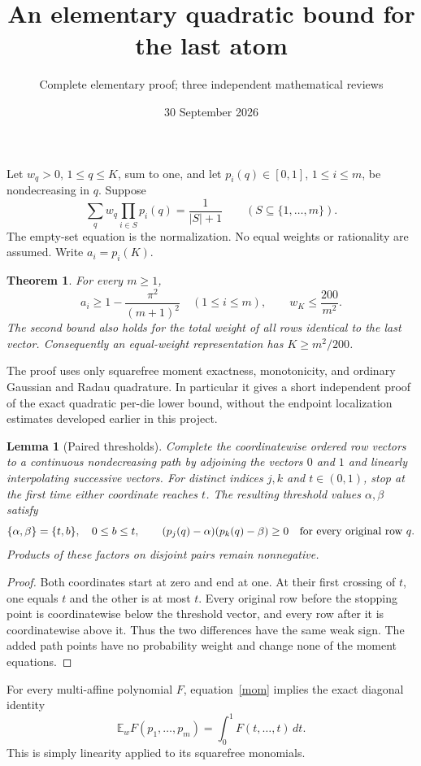 \documentclass[11pt]{article}
\title{An elementary quadratic bound for the last atom}
\author{Complete elementary proof; three independent mathematical reviews}
\date{30 September 2026}
\newtheorem{theorem}{Theorem}\newtheorem{lemma}{Lemma}
\begin{document}
\maketitle
Let $w_q>0$, $1\le q\le K$, sum to one, and let
$p_i(q)\in[0,1]$, $1\le i\le m$, be nondecreasing in $q$. Suppose
\begin{equation}\label{mom}
 \sum_qw_q\prod_{i\in S}p_i(q)=\frac1{|S|+1}
 \qquad(S\subseteq\{1,\ldots,m\}).
\end{equation}
The empty-set equation is the normalization. No equal weights or
rationality are assumed. Write $a_i=p_i(K)$.

\begin{theorem}\label{main}
For every $m\ge1$,
\[
 a_i\ge1-\frac{\pi^2}{(m+1)^2}\quad(1\le i\le m),
 \qquad w_K\le\frac{200}{m^2}.
\]
The second bound also holds for the total weight of all rows identical
to the last vector. Consequently an equal-weight representation has
$K\ge m^2/200$.
\end{theorem}

The proof uses only squarefree moment exactness, monotonicity, and
ordinary Gaussian and Radau quadrature. In particular it gives a short
independent proof of the exact quadratic per-die lower bound, without
the endpoint localization estimates developed earlier in this project.

\begin{lemma}[Paired thresholds]\label{pair}
Complete the coordinatewise ordered row vectors to a continuous
nondecreasing path by adjoining the vectors $0$ and $1$ and linearly
interpolating successive vectors. For distinct indices $j,k$ and
$t\in(0,1)$, stop at the first time either coordinate reaches $t$.
The resulting threshold values $\alpha,\beta$ satisfy
\[
 \{\alpha,\beta\}=\{t,b\},\quad 0\le b\le t,
 \qquad (p_j(q)-\alpha)(p_k(q)-\beta)\ge0
 \quad\hbox{for every original row }q.
\]
Products of these factors on disjoint pairs remain nonnegative.
\end{lemma}
\begin{proof}
Both coordinates start at zero and end at one. At their first crossing
of $t$, one equals $t$ and the other is at most $t$. Every original row
before the stopping point is coordinatewise below the threshold vector,
and every row after it is coordinatewise above it. Thus the two
differences have the same weak sign. The added path points have no
probability weight and change none of the moment equations.
\end{proof}

For every multi-affine polynomial $F$, equation~\eqref{mom} implies
the exact diagonal identity
\begin{equation}\label{diagonal}
 \mathbb E_w F(p_1,\ldots,p_m)=\int_0^1F(t,\ldots,t)\,dt.
\end{equation}
This is simply linearity applied to its squarefree monomials.
\end{document}
